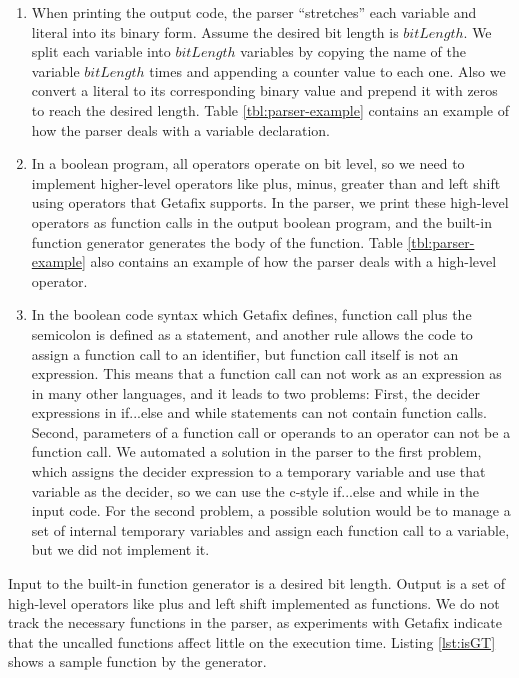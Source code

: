 \begin{enumerate}
\item When printing the output code, the parser ``stretches'' each variable and literal into its binary form. Assume the desired bit length is $bitLength$. We split each variable into $bitLength$ variables by copying the name of the variable $bitLength$ times and appending a counter value to each one. Also we convert a literal to its corresponding binary value and prepend it with zeros to reach the desired length. Table \ref{tbl:parser-example} contains an example of how the parser deals with a variable declaration.
\item In a boolean program, all operators operate on bit level, so we need to implement higher-level operators like plus, minus, greater than and left shift using operators that Getafix supports. In the parser, we print these high-level operators as function calls in the output boolean program, and the built-in function generator generates the body of the function. Table \ref{tbl:parser-example} also contains an example of how the parser deals with a high-level operator.
\item In the boolean code syntax which Getafix defines, function call plus the semicolon is defined as a statement, and another rule allows the code to assign a function call to an identifier, but function call itself is not an expression. This means that a function call can not work as an expression as in many other languages, and it leads to two problems: First, the decider expressions in if...else and while statements can not contain function calls. Second, parameters of a function call or operands to an operator can not be a function call. We automated a solution in the parser to the first problem, which assigns the decider expression to a temporary variable and use that variable as the decider, so we can use the c-style if...else and while in the input code. For the second problem, a possible solution would be to manage a set of internal temporary variables and assign each function call to a variable, but we did not implement it.
\end{enumerate}

Input to the built-in function generator is a desired bit length. Output is a set of high-level operators like plus and left shift implemented as functions. We do not track the necessary functions in the parser, as experiments with Getafix indicate that the uncalled functions affect little on the execution time. Listing \ref{lst:isGT} shows a sample function by the generator.

